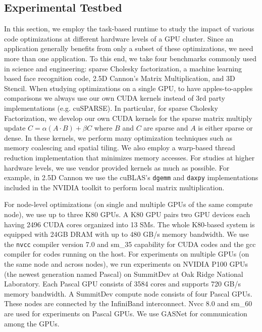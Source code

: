 \subsection{Experimental Testbed}
In this section, we employ the task-based runtime to study the impact of various code optimizations at different hardware levels of a GPU cluster.
Since an application generally benefits from only a subset of these optimizations, we need more than one application.
To this end, we take four benchmarks commonly used in science and engineering: sparse Cholesky factorization, a machine learning based face recognition code, 2.5D Cannon's Matrix Multiplication, and 3D Stencil.
When studying optimizations on a single GPU, to have apples-to-apples comparisons we always use our own CUDA kernels instead of 3rd party implementations (e.g. cuSPARSE). 
In particular, for sparse Cholesky Factorization, we develop our own CUDA kernels for the sparse matrix multiply update $C = \alpha (A \cdot B) + \beta C$ where $B$ and $C$ are sparse and $A$ is either sparse or dense.
In these kernels, we perform many optimization techniques such as memory coalescing and spatial tiling.
We also employ a warp-based thread reduction implementation that minimizes memory accesses.
For studies at higher hardware levels, we use vendor provided kernels as much as possible.
For example, in  2.5D Cannon we use the cuBLAS's {\tt dgemm} and {\tt daxpy} implementations included in the NVIDIA toolkit to perform local matrix multiplication.

For node-level optimizations (on single and multiple GPUs of the same compute node), we use up to three K80 GPUs.
A K80 GPU pairs two GPU devices each having 2496 CUDA cores organized into 13 SMs.
The whole K80-based system is equipped with 24GB DRAM with up to 480 GB/s memory bandwidth.
We use the {\tt nvcc} compiler version 7.0 and sm\_35 capability for CUDA codes and the gcc compiler for codes running on the host.
For experiments on multiple GPUs (on the same node and across nodes), we run experiments on NVIDIA P100 GPUs (the newest generation named Pascal) on SummitDev at Oak Ridge National Laboratory.
Each Pascal GPU consists of 3584 cores and supports 720 GB/s memory bandwidth.
A SummitDev compute node consists of four Pascal GPUs.
These nodes are connected by the InfiniBand interconnect.
Nvcc 8.0 and sm\_60 are used for experiments on Pascal GPUs.
We use GASNet for communication among the GPUs. 


